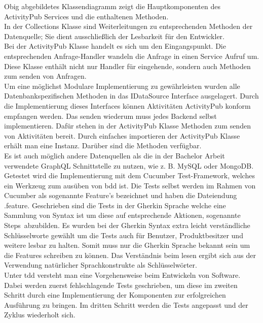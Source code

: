 Obig abgebildetes Klassendiagramm zeigt die Hauptkomponenten des ActivityPub Services und die enthaltenen Methoden.\\
In der Collections Klasse sind Weiterleitungen zu entsprechenden Methoden der Datenquelle; Sie dient ausschließlich der Lesbarkeit für den Entwickler.\\
Bei der ActivityPub Klasse handelt es sich um den Eingangspunkt. Die entsprechenden Anfrage-Handler wandeln die Anfrage in einen Service Aufruf um. Diese Klasse enthält nicht nur Handler für eingehende, sondern auch Methoden zum senden von Anfragen.\\

Um eine möglichst Modulare Implementierung zu gewährleisten wurden alle Datenbankspezifischen Methoden in das IDataSource Interface ausgelagert. Durch die Implementierung dieses Interfaces können Aktivitäten ActivityPub konform empfangen werden. Das senden wiederum muss jedes Backend selbst implementieren. Dafür stehen in der ActivityPub Klasse Methoden zum senden von Aktivitäten bereit. Durch einfaches importieren der ActivityPub Klasse erhält man eine Instanz. Darüber sind die Methoden verfügbar.\\

Es ist auch möglich andere Datenquellen als die in der Bachelor Arbeit verwendete GraphQL Schnittstelle zu nutzen, wie z. B. MySQL oder MongoDB.\\

Getestet wird die Implementierung mit dem Cucumber Test-Framework, welches ein Werkzeug zum ausüben von \gls{bdd} ist. Die Tests selbst werden im Rahmen von Cucumber als sogenannte \glqq Feature\grqq's bezeichnet und haben die Dateiendung \glqq .feature\grqq. Geschrieben sind die Tests in der Gherkin Sprache welche eine Sammlung von Syntax ist um diese auf entsprechende Aktionen, sogenannte \glqq Steps\grqq~abzubilden. Es wurden bei der Gherkin Syntax extra leicht verständliche Schlüsselworte gewählt um die Tests auch für Benutzer, Produktbesitzer und weitere lesbar zu halten. Somit muss nur die Gherkin Sprache bekannt sein um die Features schreiben zu können. Das Verständnis beim lesen ergibt sich aus der Verwendung natürlicher Sprachkonstrukte als Schlüsselwörter.\\

Unter \gls{tdd} versteht man eine Vorgehensweise beim Entwickeln von Software. Dabei werden zuerst fehlschlagende Tests geschrieben, um diese im zweiten Schritt durch eine Implementierung der Komponenten zur erfolgreichen Ausführung zu bringen. Im dritten Schritt werden die Tests angepasst und der Zyklus wiederholt sich.\\

